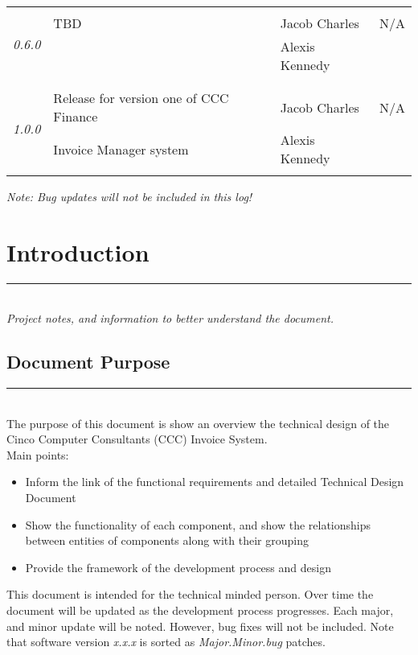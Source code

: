\documentclass[]{article}
\newcommand{\HRule}{\rule{\linewidth}{0.5mm}}
\begin{document}
\begin{table}
\begin{tabular}{|l|l|l|l|}
			\multirow{4}{*}{\emph{0.6.0}} 
				
			& & & \\
			& TBD & Jacob Charles & N/A \\
			& & Alexis Kennedy & \\
			& & & \\
			\hline
				
			\multirow{4}{*}{\emph{1.0.0}} 

			& & & \\
			& Release for version one of CCC Finance & Jacob Charles & N/A \\
			& Invoice Manager system & Alexis Kennedy & \\
			& & & \\
			\hline
				
		\end{tabular}
	\end{table}
	\textit{Note: Bug updates will not be included in this log!}
	\vfill	
	

	\newpage
	\tableofcontents
	\newpage
	
	
	\section{Introduction}
	\HRule \\[0.5cm]
	\textit{Project notes, and information to better understand the document.}
	
	
	\subsection{Document Purpose}
	\HRule \\[0.5cm]
	The purpose of this document is show an overview the technical design of the Cinco
	Computer Consultants (CCC) Invoice System. \\ Main points:
	\begin{itemize}
  		\item Inform the link of the functional requirements and detailed Technical Design 
  		Document
  		\item Show the functionality of each component, and show the relationships between 
  		entities of components along with their grouping
  		\item Provide the framework of the development process and design
	\end{itemize}
	This document is intended for the technical minded person. Over time the document will
	be updated as the development process progresses. Each major, and minor update will be 
	noted. However, bug fixes will not be included. Note that software version 
	\emph{x.x.x} is sorted as \emph{Major.Minor.bug} patches.  
	
\end{document}
